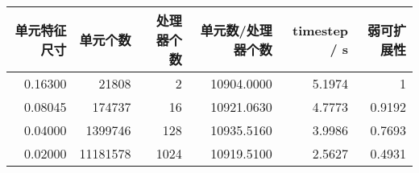         \begin{tabular}{rrrrrr}
          单元特征尺寸  &  单元个数  &  处理器个数  &  单元数/处理器个数  &  timestep / s  &  弱可扩展性  \\
          \hline
          0.16300  &     21808  &           2  &         10904.0000  &        5.1974  &           1  \\
          0.08045  &    174737  &          16  &         10921.0630  &        4.7773  &      0.9192  \\
          0.04000  &   1399746  &         128  &         10935.5160  &        3.9986  &      0.7693  \\
          0.02000  &  11181578  &        1024  &
          10919.5100  &        2.5627  &      0.4931\\
          \hline
        \end{tabular}
